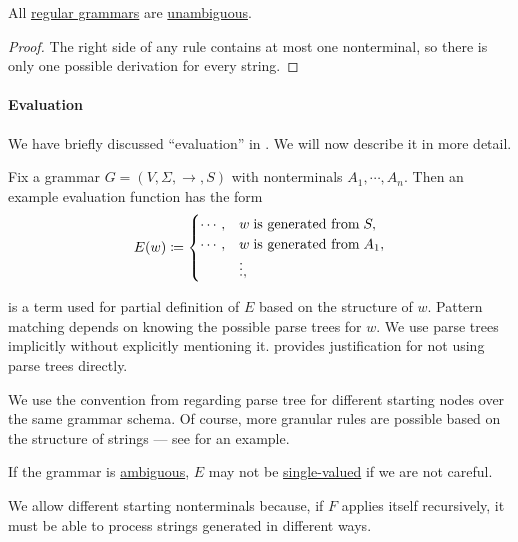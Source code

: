 \begin{proposition}\label{thm:regular_grammars_are_unambiguous}
  All \hyperref[def:chomsky_hierarchy/regular]{regular grammars} are \hyperref[def:grammar_ambiguity]{unambiguous}.
\end{proposition}
\begin{proof}
  The right side of any rule contains at most one nonterminal, so there is only one possible derivation for every string.
\end{proof}

\paragraph{Evaluation}

\begin{concept}\label{con:evaluation}
  We have briefly discussed \enquote{evaluation} in . We will now describe it in more detail.

  Fix a grammar \( G = (V, \Sigma, \to, S) \) with nonterminals \( A_1, \cdots, A_n \). Then an example evaluation function has the form
  \begin{equation*}
    E(w) \coloneqq \begin{cases}
      \cdots, &w \T{is generated from} S, \\
      \cdots, &w \T{is generated from} A_1, \\
              &\vdots,
    \end{cases}
  \end{equation*}

   is a term used for partial definition of \( E \) based on the structure of \( w \). Pattern matching depends on knowing the possible parse trees for \( w \). We use parse trees implicitly without explicitly mentioning it.  provides justification for not using parse trees directly.

  We use the convention from  regarding parse tree for different starting nodes over the same grammar schema. Of course, more granular rules are possible based on the structure of strings --- see  for an example.
\end{concept}
\begin{comments}
  \item If the grammar is \hyperref[def:grammar_ambiguity]{ambiguous}, \( E \) may not be \hyperref[def:function]{single-valued} if we are not careful.
  \item We allow different starting nonterminals because, if \( F \) applies itself recursively, it must be able to process strings generated in different ways.
\end{comments}

